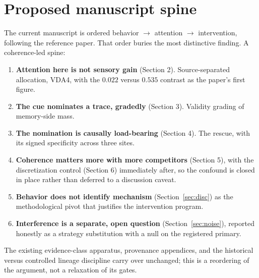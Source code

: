 \documentclass[11pt]{article}
\begin{document}
\section{Proposed manuscript spine}

The current manuscript is ordered behavior $\rightarrow$ attention $\rightarrow$ intervention,
following the reference paper. That order buries the most distinctive finding. A coherence-led
spine:

\begin{enumerate}[leftmargin=1.6em,itemsep=2pt]
\item \textbf{Attention here is not sensory gain} (Section 2). Source-separated allocation,
VDA4, with the $0.022$ versus $0.535$ contrast as the paper's first figure.
\item \textbf{The cue nominates a trace, gradedly} (Section 3). Validity grading of
memory-side mass.
\item \textbf{The nomination is causally load-bearing} (Section 4). The rescue, with its
signed specificity across three sites.
\item \textbf{Coherence matters more with more competitors} (Section 5), with the
discretization control (Section 6) immediately after, so the confound is closed in place
rather than deferred to a discussion caveat.
\item \textbf{Behavior does not identify mechanism} (Section~\ref{sec:disc}) as the
methodological pivot that justifies the intervention program.
\item \textbf{Interference is a separate, open question} (Section~\ref{sec:noise}), reported
honestly as a strategy substitution with a null on the registered primary.
\end{enumerate}

\noindent The existing evidence-class apparatus, provenance appendices, and the historical
versus controlled lineage discipline carry over unchanged; this is a reordering of the
argument, not a relaxation of its gates.
\end{document}
